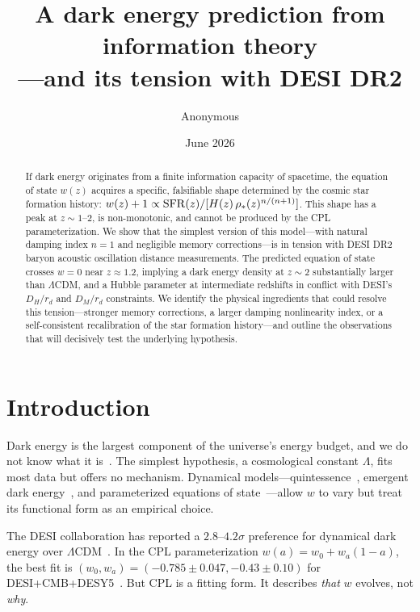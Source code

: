 \documentclass[12pt,a4paper]{article}
\begin{document}
\title{\bf A dark energy prediction from information theory\\---and its tension with DESI DR2}

\author{Anonymous}
\date{June 2026}

\maketitle

\begin{abstract}
If dark energy originates from a finite information capacity of spacetime, the equation of state $w(z)$ acquires a specific, falsifiable shape determined by the cosmic star formation history: $w(z)+1\propto{\rm SFR}(z)/[H(z)\,\rho_*(z)^{n/(n+1)}]$. This shape has a peak at $z\sim1$--$2$, is non-monotonic, and cannot be produced by the CPL parameterization. We show that the simplest version of this model---with natural damping index $n=1$ and negligible memory corrections---is in tension with DESI DR2 baryon acoustic oscillation distance measurements. The predicted equation of state crosses $w=0$ near $z\approx1.2$, implying a dark energy density at $z\sim2$ substantially larger than $\Lambda$CDM, and a Hubble parameter at intermediate redshifts in conflict with DESI's $D_H/r_d$ and $D_M/r_d$ constraints. We identify the physical ingredients that could resolve this tension---stronger memory corrections, a larger damping nonlinearity index, or a self-consistent recalibration of the star formation history---and outline the observations that will decisively test the underlying hypothesis.
\end{abstract}

\section*{Introduction}

Dark energy is the largest component of the universe's energy budget, and we do not know what it is~\cite{riess1998,spergel2003}. The simplest hypothesis, a cosmological constant $\Lambda$, fits most data but offers no mechanism. Dynamical models---quintessence~\cite{tsujikawa2013}, emergent dark energy~\cite{li2024}, and parameterized equations of state~\cite{chevallier2001}---allow $w$ to vary but treat its functional form as an empirical choice.

The DESI collaboration has reported a $2.8$--$4.2\sigma$ preference for dynamical dark energy over $\Lambda$CDM~\cite{desi2025}. In the CPL parameterization $w(a)=w_0+w_a(1-a)$, the best fit is $(w_0,w_a)=(-0.785\pm0.047,-0.43\pm0.10)$ for DESI+CMB+DESY5~\cite{li2026}. But CPL is a fitting form. It describes {\it that} $w$ evolves, not {\it why}.
\end{document}
